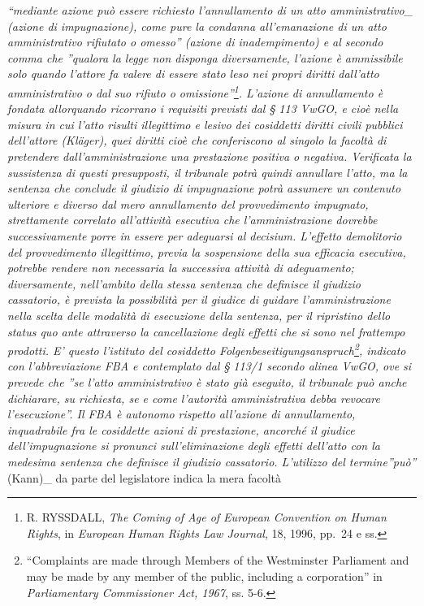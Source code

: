 \documentclass[12pt,it,a4paper,]{report}
\begin{document}
\emph{``mediante azione può essere richiesto l'annullamento di un atto
amministrativo\_ (azione di impugnazione), \emph{come pure la condanna
all'emanazione di un atto amministrativo rifiutato o omesso''} (azione
di inadempimento) e al secondo comma che \emph{''qualora la legge non
disponga diversamente, l'azione è ammissibile solo quando l'attore fa
valere di essere stato leso nei propri diritti dall'atto amministrativo
o dal suo rifiuto o omissione''}\footnote{R. RYSSDALL, \emph{The Coming
  of Age of European Convention on Human Rights}, in \emph{European
  Human Rights Law Journal}, 18, 1996, pp.~24 e ss.}. L'azione di
annullamento è fondata allorquando ricorrano i requisiti previsti dal
\emph{§ 113 VwGO}, e cioè nella misura in cui l'atto risulti illegittimo
e lesivo dei cosiddetti diritti civili pubblici dell'attore
\emph{(Kläger)}, quei diritti cioè che conferiscono al singolo la
facoltà di pretendere dall'amministrazione una prestazione positiva o
negativa. Verificata la sussistenza di questi presupposti, il tribunale
potrà quindi annullare l'atto, ma la sentenza che conclude il giudizio
di impugnazione potrà assumere un contenuto ulteriore e diverso dal mero
annullamento del provvedimento impugnato, strettamente correlato
all'attività esecutiva che l'amministrazione dovrebbe successivamente
porre in essere per adeguarsi al \emph{decisium}. L'effetto demolitorio
del provvedimento illegittimo, previa la sospensione della sua efficacia
esecutiva, potrebbe rendere non necessaria la successiva attività di
adeguamento; diversamente, nell'ambito della stessa sentenza che
definisce il giudizio cassatorio, è prevista la possibilità per il
giudice di guidare l'amministrazione nella scelta delle modalità di
esecuzione della sentenza, per il ripristino dello \emph{status quo
ante} attraverso la cancellazione degli effetti che si sono nel
frattempo prodotti. E' questo l'istituto del cosiddetto
\emph{Folgenbeseitigungsanspruch}\footnote{``Complaints are made through
  Members of the Westminster Parliament and may be made by any member of
  the public, including a corporation'' in \emph{Parliamentary
  Commissioner Act, 1967}, ss. 5-6.}, indicato con l'abbreviazione
\emph{FBA} e contemplato dal \emph{§ 113/1} secondo alinea \emph{VwGO},
ove si prevede che \emph{''se l'atto amministrativo è stato già
eseguito, il tribunale può anche dichiarare, su richiesta, se e come
l'autorità amministrativa debba revocare l'esecuzione''}. Il \emph{FBA}
è autonomo rispetto all'azione di annullamento, inquadrabile fra le
cosiddette azioni di prestazione, ancorché il giudice dell'impugnazione
si pronunci sull'eliminazione degli effetti dell'atto con la medesima
sentenza che definisce il giudizio cassatorio. L'utilizzo del
termine''può'' }(Kann)\_ da parte del legislatore indica la mera facoltà
\end{document}
